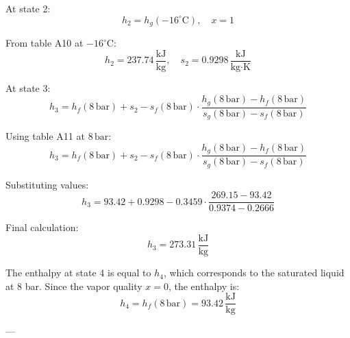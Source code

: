 At state 2:  
\[
h_2 = h_g(-16^\circ\text{C}), \quad x = 1
\]

From table A10 at \( -16^\circ\text{C} \):  
\[
h_2 = 237.74 \, \frac{\text{kJ}}{\text{kg}}, \quad s_2 = 0.9298 \, \frac{\text{kJ}}{\text{kg·K}}
\]

At state 3:  
\[
h_3 = h_f(8 \, \text{bar}) + s_2 - s_f(8 \, \text{bar}) \cdot \frac{h_g(8 \, \text{bar}) - h_f(8 \, \text{bar})}{s_g(8 \, \text{bar}) - s_f(8 \, \text{bar})}
\]

Using table A11 at \( 8 \, \text{bar} \):  
\[
h_3 = h_f(8 \, \text{bar}) + s_2 - s_f(8 \, \text{bar}) \cdot \frac{h_g(8 \, \text{bar}) - h_f(8 \, \text{bar})}{s_g(8 \, \text{bar}) - s_f(8 \, \text{bar})}
\]

Substituting values:  
\[
h_3 = 93.42 + 0.9298 - 0.3459 \cdot \frac{269.15 - 93.42}{0.9374 - 0.2666}
\]

Final calculation:  
\[
h_3 = 273.31 \, \frac{\text{kJ}}{\text{kg}}
\]

The enthalpy at state 4 is equal to \( h_4 \), which corresponds to the saturated liquid at 8 bar. Since the vapor quality \( x = 0 \), the enthalpy is:
\[
h_4 = h_f(8 \, \text{bar}) = 93.42 \, \frac{\text{kJ}}{\text{kg}}
\]

---